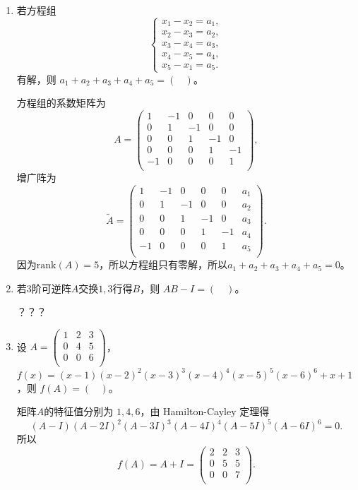 \begin{enumerate}[1~]
\begin{enumerate}[1.~]
\item
若方程组
$$
\left\{ \begin{array} { l } { x _ { 1 } - x _ { 2 } = a _ { 1 } }, \\ { x _ { 2 } - x _ { 3 } = a _ { 2 } } ,\\ { x _ { 3 } - x _ { 4 } = a _ { 3 } }, \\ { x _ { 4 } - x _ { 5 } = a _ { 4 } } ,\\ { x _ { 5 } - x _ { 1 } = a _ { 5 } }. \end{array} \right.
$$
有解，则 $a_1 + a_2 + a_3 + a_4 + a_5 = (\ \ \ \ )$。
\begin{solution}
方程组的系数矩阵为\[
A=\left( \begin{matrix}
	1&		-1&		0&		0&		0\\
	0&		1&		-1&		0&		0\\
	0&		0&		1&		-1&		0\\
	0&		0&		0&		1&		-1\\
	-1&		0&		0&		0&		1\\
\end{matrix} \right),\]
增广阵为\[
\tilde{A}=\left( \begin{matrix}
	1&		-1&		0&		0&		0&a_1\\
	0&		1&		-1&		0&		0&a_2\\
	0&		0&		1&		-1&		0&a_3\\
	0&		0&		0&		1&		-1&a_4  \\
	-1&		0&		0&		0&		1&a_5\\
\end{matrix} \right).\]
因为$\mathrm{rank}(A)=5$，所以方程组只有零解，所以$a_1+a_2+a_3+a_4+a_5=0$。
\end{solution}

\item
若$3$阶可逆阵$A$交换$1, 3$行得$B$，则 $AB-I = (\quad)$。
\begin{solution}
？？？
\end{solution}

\item
设 $A=\left( \begin{smallmatrix}
	1&		2&		3\\
	0&		4&		5\\
	0&		0&		6\\
\end{smallmatrix} \right) $，$f(x) = (x - 1)(x - 2)^2(x - 3)^3(x - 4)^4(x - 5)^5(x - 6)^6 + x + 1$，则 $f(A) = (\ \ \ \ )$。
\begin{solution}
矩阵$A$的特征值分别为 $1, 4, 6$，由 Hamilton-Cayley 定理得
$$(A-I)(A-2I)^2(A-3I)^3(A-4I)^4(A-5I)^5(A-6I)^6 = 0.$$
所以
$$f(A) = A+I=\left( \begin{matrix}
	2&		2&		3\\
	0&		5&		5\\
	0&		0&		7\\
\end{matrix} \right). $$
\end{solution}
\end{enumerate}


\end{enumerate}
